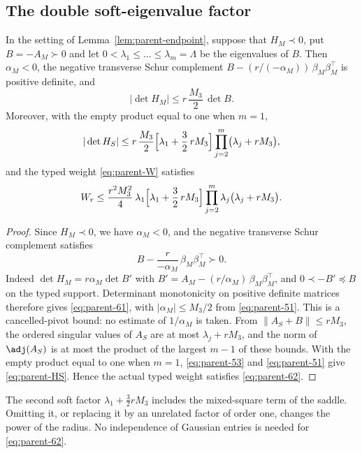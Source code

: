 \subsection{The double soft-eigenvalue factor}\label{ssec:parent-soft}

\begin{lemma}\label{lem:parent-soft}
In the setting of Lemma~\ref{lem:parent-endpoint}, suppose that $H_M\prec0$, put $B=-A_M\succ0$ and let $0<\lambda_1\le\dots\le\lambda_m=\Lambda$ be the eigenvalues of $B$. Then $\alpha_M<0$, the negative transverse Schur complement $B-(r/(-\alpha_M))\,\beta_M\beta_M^{\top}$ is positive definite, and
\begin{equation}\label{eq:parent-61}
|\det H_M|\le r\,\frac{M_3}2\,\det B .
\end{equation}
Moreover, with the empty product equal to one when $m=1$,
\begin{equation}\label{eq:parent-HS}
|\det H_S|\le r\,\frac{M_3}2\Bigl[\lambda_1+\frac32\,rM_3\Bigr]\prod_{j=2}^m\bigl(\lambda_j+rM_3\bigr),
\end{equation}
and the typed weight \eqref{eq:parent-W} satisfies
\begin{equation}\label{eq:parent-62}
W_r\le\frac{r^2M_3^2}4\,\lambda_1\Bigl[\lambda_1+\frac32\,rM_3\Bigr]\prod_{j=2}^m\lambda_j\bigl(\lambda_j+rM_3\bigr).
\end{equation}
\end{lemma}

\begin{proof}
Since $H_M\prec0$, we have $\alpha_M<0$, and the negative transverse Schur complement satisfies
\[
B-\frac r{-\alpha_M}\,\beta_M\beta_M^{\top}\succ0 .
\]
Indeed $\det H_M=r\alpha_M\det B'$ with $B'=A_M-(r/\alpha_M)\,\beta_M\beta_M^{\top}$, and $0\prec-B'\preceq B$ on the typed support. Determinant monotonicity on positive definite matrices therefore gives \eqref{eq:parent-61}, with $|\alpha_M|\le M_3/2$ from \eqref{eq:parent-51}. This is a cancelled-pivot bound: no estimate of $1/\alpha_M$ is taken. From $\|A_S+B\|\le rM_3$, the ordered singular values of $A_S$ are at most $\lambda_j+rM_3$, and the norm of $\adj(A_S)$ is at most the product of the largest $m-1$ of these bounds. With the empty product equal to one when $m=1$, \eqref{eq:parent-53} and \eqref{eq:parent-51} give \eqref{eq:parent-HS}. Hence the actual typed weight satisfies \eqref{eq:parent-62}.
\end{proof}

The second soft factor $\lambda_1+\frac32rM_3$ includes the mixed-square term of the saddle. Omitting it, or replacing it by an unrelated factor of order one, changes the power of the radius. No independence of Gaussian entries is needed for \eqref{eq:parent-62}.

